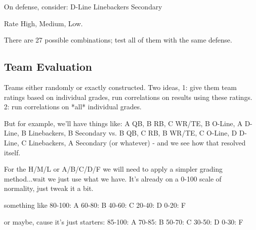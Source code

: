 \documentclass[11pt]{article}
\begin{document}
On defense, consider:
D-Line
Linebackers
Secondary

Rate High, Medium, Low.

There are 27 possible combinations; test all of them with the same defense.
\subsection{Team Evaluation}
Teams either randomly or exactly constructed. Two ideas, 1: give them team ratings based on individual grades, run correlations on results using these ratings. 2: run correlations on *all* individual grades.

But for example, we'll have things like: A QB, B RB, C WR/TE, B O-Line, A D-Line, B Linebackers, B Secondary vs. B QB, C RB, B WR/TE, C O-Line, D D-Line, C Linebackers, A Secondary (or whatever) - and we see how that resolved itself.

For the H/M/L or A/B/C/D/F we will need to apply a simpler grading method...wait we just use what we have. It's already on a 0-100 scale of normality, just tweak it a bit. 

something like
80-100: A
60-80: B
40-60: C
20-40: D
0-20: F

or maybe, cause it's just starters:
85-100: A
70-85: B
50-70: C
30-50: D
0-30: F





\end{document}
